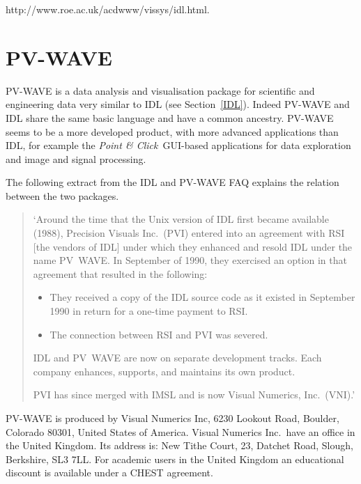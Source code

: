 \begin{htmlonly}
{http://www.roe.ac.uk/acdwww/vissys/idl.html}.
\end{htmlonly}


\section{PV-WAVE \label{PVWAVE}  }

PV-WAVE is a data analysis and visualisation package for scientific
and engineering data very similar to IDL (see Section~\ref{IDL}).
Indeed PV-WAVE and IDL share the same basic language and have a common
ancestry. PV-WAVE seems to be a more developed product, with more
advanced applications than IDL, for example the {\it Point \& Click}\,
GUI-based applications for data exploration and image and signal
processing.

The following extract from the IDL and PV-WAVE FAQ explains the relation
between the two packages.

\begin{quote}
`Around the time that the Unix version of IDL first became
available (1988), Precision Visuals Inc.\ (PVI) entered into an agreement
with RSI [the vendors of IDL] under which they enhanced and resold IDL 
under the name PV~WAVE. In September of 1990, they exercised an option in 
that agreement that resulted in the following:

\begin{itemize}

  \item They received a copy of the IDL source code as it existed in
   September 1990 in return for a one-time payment to RSI.

  \item The connection between RSI and PVI was severed.

\end{itemize}

IDL and PV~WAVE are now on separate development tracks. Each company 
enhances, supports, and maintains its own product.

PVI has since merged with IMSL and is now Visual Numerics, Inc.\ (VNI).'
\end{quote}

PV-WAVE is produced by Visual Numerics Inc, 6230 Lookout Road, Boulder,
Colorado 80301, United States of America.  Visual Numerics Inc.\ have an
office in the United Kingdom. Its address is: New Tithe Court, 23,
Datchet Road, Slough, Berkshire, SL3 7LL. For academic users in the
United Kingdom an educational discount is available under a CHEST
agreement.

